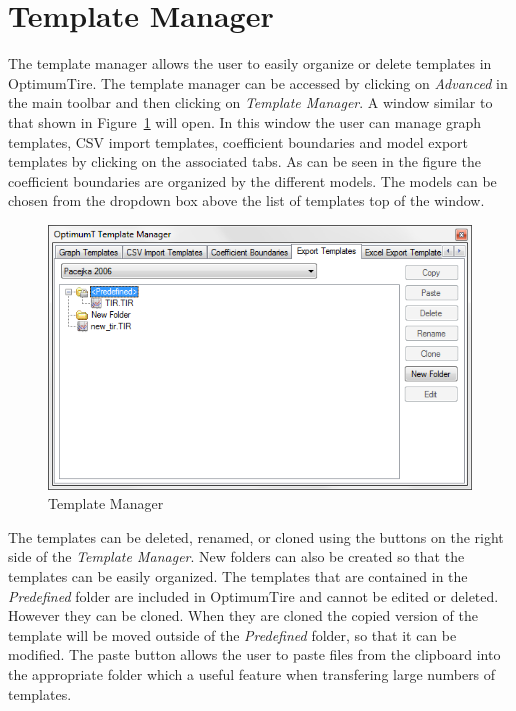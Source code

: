 			
\section{Template Manager}
\label{sec:TemplateManager}

The template manager allows the user to easily organize or delete templates in OptimumTire. The template manager can be accessed by clicking on \textsl{Advanced} in the main toolbar and then clicking on \textsl{Template Manager}. A window similar to that shown in Figure~\ref{fig:TemplateManager} will open. In this window the user can manage graph templates, CSV import templates, coefficient boundaries and model export templates by clicking on the associated tabs. As can be seen in the figure the coefficient boundaries are organized by the different models. The models can be chosen from the dropdown box above the list of templates top of the window.

\begin{figure}[H]
	\centering
		\includegraphics[width=1.0\textwidth]{TemplateManager.png}
	\caption{Template Manager}
	\label{fig:TemplateManager}
\end{figure}

The templates can be deleted, renamed, or cloned using the buttons on the right side of the \textsl{Template Manager}. New folders can also be created so that the templates can be easily organized. The templates that are contained in the \textsl{Predefined} folder are included in OptimumTire and cannot be edited or deleted. However they can be cloned. When they are cloned the copied version of the template will be moved outside of the \textsl{Predefined} folder, so that it can be modified. The paste button allows the user to paste files from the clipboard into the appropriate folder which a useful feature when transfering large numbers of templates.

